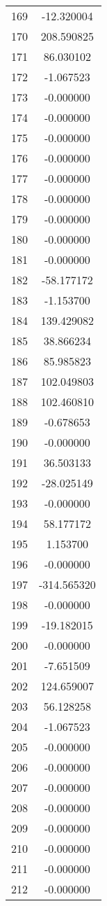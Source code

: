 \documentclass[12pt]{article}
\begin{document}
\begin{longtable}{@{}cc@{}}
169 & -12.320004 \\
170 & 208.590825 \\
171 & 86.030102 \\
172 & -1.067523 \\
173 & -0.000000 \\
174 & -0.000000 \\
175 & -0.000000 \\
176 & -0.000000 \\
177 & -0.000000 \\
178 & -0.000000 \\
179 & -0.000000 \\
180 & -0.000000 \\
181 & -0.000000 \\
182 & -58.177172 \\
183 & -1.153700 \\
184 & 139.429082 \\
185 & 38.866234 \\
186 & 85.985823 \\
187 & 102.049803 \\
188 & 102.460810 \\
189 & -0.678653 \\
190 & -0.000000 \\
191 & 36.503133 \\
192 & -28.025149 \\
193 & -0.000000 \\
194 & 58.177172 \\
195 & 1.153700 \\
196 & -0.000000 \\
197 & -314.565320 \\
198 & -0.000000 \\
199 & -19.182015 \\
200 & -0.000000 \\
201 & -7.651509 \\
202 & 124.659007 \\
203 & 56.128258 \\
204 & -1.067523 \\
205 & -0.000000 \\
206 & -0.000000 \\
207 & -0.000000 \\
208 & -0.000000 \\
209 & -0.000000 \\
210 & -0.000000 \\
211 & -0.000000 \\
212 & -0.000000 \\

\end{longtable}
\end{document}
